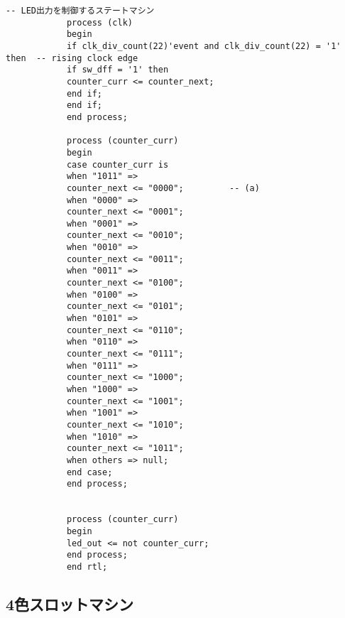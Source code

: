 \documentclass{ltjsarticle}
\begin{document}
\begin{lstlisting}[caption=sample7, label=sample7]
			-- LED出力を制御するステートマシン
			process (clk)
			begin
			if clk_div_count(22)'event and clk_div_count(22) = '1' then  -- rising clock edge
			if sw_dff = '1' then
			counter_curr <= counter_next;
			end if;
			end if;
			end process;

			process (counter_curr)
			begin
			case counter_curr is
			when "1011" =>
			counter_next <= "0000";         -- (a)
			when "0000" =>
			counter_next <= "0001";
			when "0001" =>
			counter_next <= "0010";
			when "0010" =>
			counter_next <= "0011";
			when "0011" =>
			counter_next <= "0100";
			when "0100" =>
			counter_next <= "0101";
			when "0101" =>
			counter_next <= "0110";
			when "0110" =>
			counter_next <= "0111";
			when "0111" =>
			counter_next <= "1000";
			when "1000" =>
			counter_next <= "1001";
			when "1001" =>
			counter_next <= "1010";
			when "1010" =>
			counter_next <= "1011";
			when others => null;
			end case;
			end process;


			process (counter_curr)
			begin
			led_out <= not counter_curr;
			end process;
			end rtl;

		\end{lstlisting}

		\subsection{4色スロットマシン}
\end{document}
